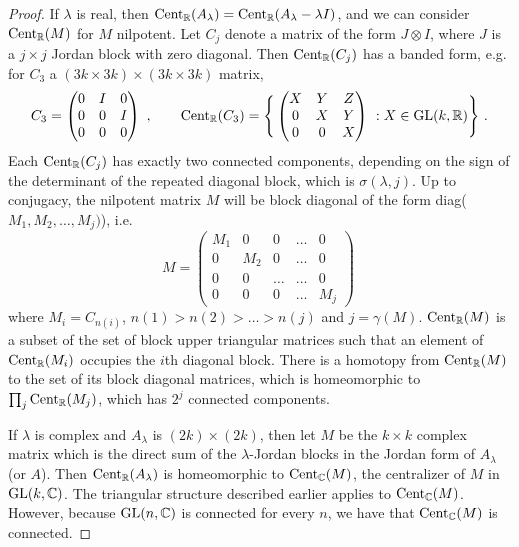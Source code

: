 \documentclass{amsart}
\theoremstyle{definition}
\theoremstyle{remark}
\numberwithin{equation}{section}
\begin{document}
{{\begin{proof}
If $\lambda$ is real, then 
$\textnormal{Cent}_{\mathbb R}(A_{\lambda})=
\textnormal{Cent}_{\mathbb R}(A_{\lambda}-\lambda I)$, 
and we can consider  
$\textnormal{Cent}_{\mathbb R}(M)$ for $M$ nilpotent. 
Let $C_j$ denote a matrix of the form $J\otimes I$, where 
$J$ is a  $j\times j$ Jordan block with zero diagonal. Then 
$\textnormal{Cent}_{\mathbb R}(C_j)$ has a banded form, e.g. 
for $C_3$ a $(3k\times 3k)\times (3k\times 3k)$ matrix,  
\[
C_3= \begin{pmatrix} 0 & I & 0 \\ 0 & 0 & I \\ 0 & 0 & 0 
\end{pmatrix}\ , \qquad 
\textnormal{Cent}_{\mathbb R}(C_3)= \Bigg\{ 
\begin{pmatrix} X & Y & Z \\ 0 & X & Y \\ 0 & 0 & X 
\end{pmatrix}\ : 
X\in \textnormal{GL}(k,\mathbb R)
\Bigg\}\ . 
\] 
Each  $\textnormal{Cent}_{\mathbb R}(C_j)$ has exactly 
two connected components, depending on the sign of 
the determinant of the repeated diagonal block, 
which is $\sigma(\lambda ,j)$. Up to 
conjugacy, the nilpotent matrix $M$ will be block 
diagonal of the form diag($M_1, M_2, \dots , M_j)$), i.e. 
\[ 
M= \begin{pmatrix} 
M_1 & 0   & 0     &  \dots  &  0 \\ 
0   & M_2 & 0     & \dots   & 0 \\ 
0   & 0   & \dots & \dots   & 0 \\ 
0   & 0   & 0     & \dots   & M_j
\end{pmatrix}\ 
\] 
where $M_i=C_{n(i)}$, $n(1)>n(2)> \dots > n(j)$ and 
$j=\gamma (M)$. 
$\textnormal{Cent}_{\mathbb R}(M)$ is a 
subset of the set of block upper triangular 
matrices such that an element of 
$\textnormal{Cent}_{\mathbb R}(M_i)$ 
occupies  the $i$th diagonal 
block. There is a homotopy from 
$\textnormal{Cent}_{\mathbb R}(M)$ to the set of its 
block diagonal matrices, which is homeomorphic to 
$\prod_j\textnormal{Cent}_{\mathbb R}(M_j)$, which 
has $2^j$ connected components. 

If $\lambda$ is complex and $A_{\lambda}$ is $(2k)\times (2k)$,
 then let $M$ be the $k\times k$ complex matrix 
which is the direct sum of the $\lambda$-Jordan blocks 
in the Jordan form of $A_{\lambda}$ (or $A$). Then 
$\textnormal{Cent}_{\mathbb R}(A_{\lambda})$ is homeomorphic to 
$\textnormal{Cent}_{\mathbb C}(M)$, 
the centralizer of $M$ in $\textnormal{GL}(k , \mathbb C)$. 
 The triangular structure 
described earlier applies to $\textnormal{Cent}_{\mathbb C}(M)$.
However, because $\textnormal{GL}(n,\mathbb C)$ is connected for every $n$, 
we have that $\textnormal{Cent}_{\mathbb C}(M)$ is connected. 
\end{proof} 


}}
\end{document}

